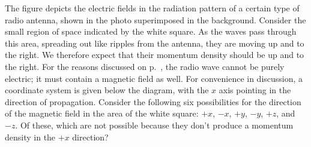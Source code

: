 The figure depicts the electric fields in
the radiation pattern of a certain type of radio antenna, shown in the photo superimposed
in the background. Consider the small region of space indicated by the white square.
As the waves pass through this area, spreading out like ripples from the antenna, they are moving up and to the right. We therefore
expect that their momentum density should be up and to the right. For the reasons discussed on
p.~\pageref{waves-not-pure-e-or-b}, the radio wave cannot be purely electric; it
must contain a magnetic field as well. For convenience in discussion, a coordinate system
is given below the diagram, with the $x$ axis pointing in the direction of propagation.
Consider the following six possibilities
for the direction of the magnetic field in the area of the white square: $+x$, $-x$,
$+y$, $-y$, $+z$, and $-z$. Of these, which are not possible because they don't
produce a momentum density in the $+x$ direction?

